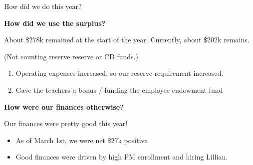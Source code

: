 \documentclass[8pt]{beamer}
\begin{document}
\begin{frame}{How did we do this year?}


\textbf{How did we use the surplus?}

About \$278k remained at the start of the year.
Currently, about \$202k remains.

(Not counting reserve reserve or CD funds.)

%
\begin{enumerate}
%
\item Operating expenses increased, so our reserve requirement increased.
\item Gave the teachers a bonus / funding the employee endowment fund
%
\end{enumerate}

\textbf{How were our finances otherwise?}

Our finances were pretty good this year!

%
\begin{itemize}
%
\item As of March 1st, we were net $\$27$k positive
\item Good finances were driven by high PM enrollment and hiring Lillian.
%
\end{itemize}
%


%
\end{frame}

\end{document}
